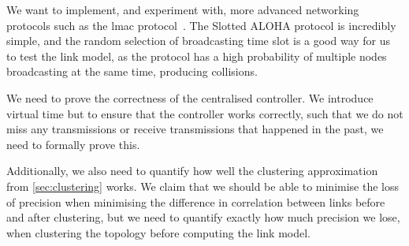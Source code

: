 We want to implement, and experiment with, more advanced networking protocols such as the \gls{lmac} protocol~\cite{paper:lmac_protocol}. The Slotted ALOHA protocol is incredibly simple, and the random selection of broadcasting time slot is a good way for us to test the link model, as the protocol has a high probability of multiple nodes broadcasting at the same time, producing collisions.\smallbreak

We need to prove the correctness of the centralised controller. We introduce virtual time but to ensure that the controller works correctly, such that we do not miss any transmissions or receive transmissions that happened in the past, we need to formally prove this.\smallbreak

Additionally, we also need to quantify how well the clustering approximation from \autoref{sec:clustering} works. We claim that we should be able to minimise the loss of precision when minimising the difference in correlation between links before and after clustering, but we need to quantify exactly how much precision we lose, when clustering the topology before computing the link model.

